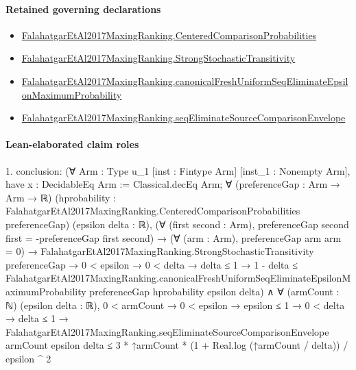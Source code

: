 \documentclass[10pt]{article}
\begin{document}
\paragraph{Retained governing declarations}
\begin{itemize}\raggedright
\item \hyperlink{paper-prerequisite-b99b697ef57f53ce}{Falahatgar\allowbreak{}Et\allowbreak{}Al2017\allowbreak{}Maxing\allowbreak{}Ranking.\allowbreak{}Centered\allowbreak{}Comparison\allowbreak{}Probabilities}
\item \hyperlink{paper-prerequisite-76807884cf8ad345}{Falahatgar\allowbreak{}Et\allowbreak{}Al2017\allowbreak{}Maxing\allowbreak{}Ranking.\allowbreak{}Strong\allowbreak{}Stochastic\allowbreak{}Transitivity}
\item \hyperlink{governing-declaration-572711c3d71d7799}{Falahatgar\allowbreak{}Et\allowbreak{}Al2017\allowbreak{}Maxing\allowbreak{}Ranking.\allowbreak{}canonical\allowbreak{}Fresh\allowbreak{}Uniform\allowbreak{}Seq\allowbreak{}Eliminate\allowbreak{}Epsilon\allowbreak{}Maximum\allowbreak{}Probability}
\item \hyperlink{governing-declaration-f89688c2e4f7c337}{Falahatgar\allowbreak{}Et\allowbreak{}Al2017\allowbreak{}Maxing\allowbreak{}Ranking.\allowbreak{}seq\allowbreak{}Eliminate\allowbreak{}Source\allowbreak{}Comparison\allowbreak{}Envelope}
\end{itemize}
\paragraph{Lean-elaborated claim roles}\begin{ReviewVerbatim}
1. conclusion: (∀ {Arm : Type u_1} [inst : Fintype Arm] [inst_1 : Nonempty Arm],
    have x : DecidableEq Arm := Classical.decEq Arm;
    ∀ (preferenceGap : Arm → Arm → ℝ)
      (hprobability : FalahatgarEtAl2017MaxingRanking.CenteredComparisonProbabilities preferenceGap)
      (epsilon delta : ℝ),
      (∀ (first second : Arm), preferenceGap second first = -preferenceGap first second) →
        (∀ (arm : Arm), preferenceGap arm arm = 0) →
          FalahatgarEtAl2017MaxingRanking.StrongStochasticTransitivity preferenceGap →
            0 < epsilon →
              0 < delta →
                delta ≤ 1 →
                  1 - delta ≤
                    FalahatgarEtAl2017MaxingRanking.canonicalFreshUniformSeqEliminateEpsilonMaximumProbability
                      preferenceGap hprobability epsilon delta) ∧
  ∀ (armCount : ℕ) (epsilon delta : ℝ),
    0 < armCount →
      0 < epsilon →
        epsilon ≤ 1 →
          0 < delta →
            delta ≤ 1 →
              FalahatgarEtAl2017MaxingRanking.seqEliminateSourceComparisonEnvelope armCount epsilon delta ≤
                3 * ↑armCount * (1 + Real.log (↑armCount / delta)) / epsilon ^ 2
\end{ReviewVerbatim}
\end{document}
